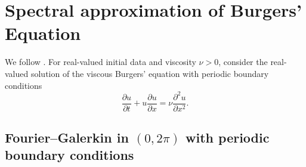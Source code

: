 \section{Spectral approximation of Burgers' Equation}
We follow \cite[Section 3.3]{CanutoHussainiQuarteroniZang2011}.
For real-valued initial data and viscosity $\nu>0$, consider the real-valued solution of the viscous Burgers' equation with periodic boundary conditions
\begin{equation}
    \frac{\partial u}{\partial t} + u \frac{\partial u}{\partial x} = \nu \frac{\partial^2 u }{\partial x^2}.
\end{equation}

\subsection{Fourier--Galerkin in $(0,2\pi)$ with periodic boundary conditions}

